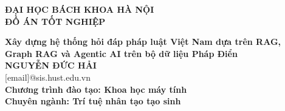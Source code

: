 \documentclass[DoAn.tex]{subfiles}
\begin{document}
\begin{titlepage}
\thispagestyle{empty}
\begin{center}

{\textbf{\large{ĐẠI HỌC BÁCH KHOA HÀ NỘI}}}\\[3cm]

{\textbf{\huge{ ĐỒ ÁN TỐT NGHIỆP}}}\\[1cm]
{\textbf{\Large{Xây dựng hệ thống hỏi đáp pháp luật Việt Nam dựa trên RAG, Graph RAG và Agentic AI trên bộ dữ liệu Pháp Điển}}\\[1cm]

{\textbf{\large{NGUYỄN ĐỨC HẢI}}}\\
{\large{[email]@sis.hust.edu.vn}}\\[0.5cm]

{\textbf{\large{Chương trình đào tạo: Khoa học máy tính}}}\\
{\textbf{\large{Chuyên ngành: Trí tuệ nhân tạo tạo sinh}}}\\

\vspace{2cm}
\begin{table}[H]
\centering
{}
\end{table}}
\end{center}



\end{titlepage}
\end{document}
